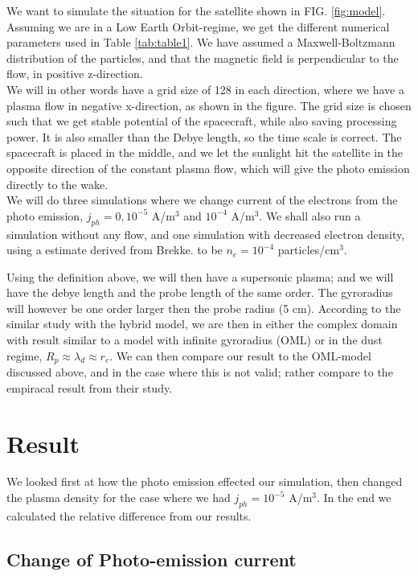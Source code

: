 \documentclass[aip, 
rsi, 
amsmath,
amssymb,
longbibliography,
preprint]{revtex4-1}
\begin{document}
We want to simulate the situation for the satellite shown in FIG. \ref{fig:model}. Assuming we are in a Low Earth Orbit-regime, we get the different numerical parameters used in Table \ref{tab:table1}. We have  assumed a Maxwell-Boltzmann distribution of the particles, and that the magnetic field is perpendicular to the flow, in positive z-direction.\\

 We will in other words have a grid size of 128 in each direction, where we have a plasma flow in negative x-direction, as shown in the figure. The grid size is chosen such that we get stable potential of the spacecraft, while also saving processing power. It is also smaller than the Debye length, so the time scale is correct. The spacecraft is placed in the middle, and we let the sunlight hit the satellite in the opposite direction of the constant plasma flow, which will give the photo emission directly to the wake.\\
 
 We will do three simulations where we change current of the electrons from the photo emission, $j_{ph} = 0, 10^{-5}$ A/m$^3$ and $10^{-4}$ A/m$^3$. We shall also run a simulation without any flow, and one simulation with decreased electron density, using a estimate derived from Brekke.\cite{Brekke} to be $n_e = 10^{-4}$ particles/cm$^3$.
 
Using the definition above, we will then have a supersonic plasma; and we will have the debye length and the probe length of the same order. The gyroradius will however be one order larger then the probe radius (5 cm). According to the similar study with the hybrid model\cite{P7}, we are then in either the complex domain with result similar to a model with infinite gyroradius (OML) or in the dust regime, $R_p \approx \lambda_d \approx r_e$. We can then compare our result to the OML-model discussed above, and in the case where this is not valid; rather compare to the empiracal result from their study.

\section{Result}

We looked first at how the photo emission effected our simulation, then changed the plasma density for the case where we had $j_{ph} = 10^{-5}$ A/m$^3$. In the end we calculated the relative difference from our results.

\subsection{Change of Photo-emission current}
\end{document}

